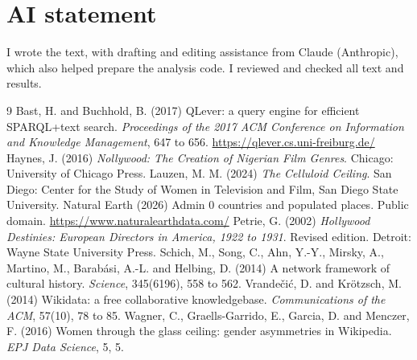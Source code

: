 \documentclass[11pt,a4paper]{article}
\begin{document}
\section*{AI statement}
I wrote the text, with drafting and editing assistance from Claude (Anthropic), which also helped prepare the analysis code. I reviewed and checked all text and results.

\begin{thebibliography}{9}
 Bast, H. and Buchhold, B. (2017) QLever: a query engine for efficient SPARQL+text search. \emph{Proceedings of the 2017 ACM Conference on Information and Knowledge Management}, 647 to 656. \url{https://qlever.cs.uni-freiburg.de/}
 Haynes, J. (2016) \emph{Nollywood: The Creation of Nigerian Film Genres}. Chicago: University of Chicago Press.
 Lauzen, M. M. (2024) \emph{The Celluloid Ceiling}. San Diego: Center for the Study of Women in Television and Film, San Diego State University.
 Natural Earth (2026) Admin 0 countries and populated places. Public domain. \url{https://www.naturalearthdata.com/}
 Petrie, G. (2002) \emph{Hollywood Destinies: European Directors in America, 1922 to 1931}. Revised edition. Detroit: Wayne State University Press.
 Schich, M., Song, C., Ahn, Y.-Y., Mirsky, A., Martino, M., Barab\'asi, A.-L. and Helbing, D. (2014) A network framework of cultural history. \emph{Science}, 345(6196), 558 to 562.
 Vrandečić, D. and Krötzsch, M. (2014) Wikidata: a free collaborative knowledgebase. \emph{Communications of the ACM}, 57(10), 78 to 85.
 Wagner, C., Graells-Garrido, E., Garcia, D. and Menczer, F. (2016) Women through the glass ceiling: gender asymmetries in Wikipedia. \emph{EPJ Data Science}, 5, 5.
\end{thebibliography}
\end{document}

